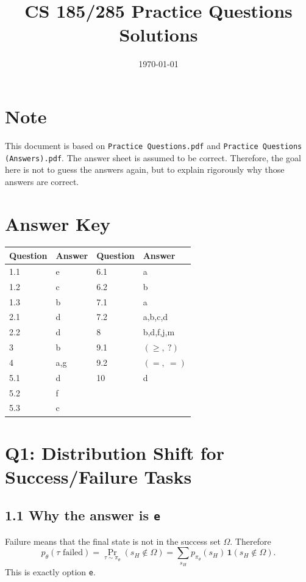 \documentclass[11pt]{article}
\title{CS 185/285 Practice Questions Solutions}
\author{}
\date{\today}
\newcommand{\1}{\mathbf{1}}
\begin{document}
\maketitle

\section*{Note}
This document is based on \texttt{Practice Questions.pdf} and \texttt{Practice Questions (Answers).pdf}. The answer sheet is assumed to be correct. Therefore, the goal here is not to guess the answers again, but to explain rigorously why those answers are correct.

\section*{Answer Key}
\begin{center}
\begin{tabular}{llll}
\toprule
Question & Answer & Question & Answer \\
\midrule
1.1 & e & 6.1 & a \\
1.2 & c & 6.2 & b \\
1.3 & b & 7.1 & a \\
2.1 & d & 7.2 & a,b,c,d \\
2.2 & d & 8 & b,d,f,j,m \\
3 & b & 9.1 & $(\ge,\ ?)$ \\
4 & a,g & 9.2 & $(=,\ =)$ \\
5.1 & d & 10 & d \\
5.2 & f & & \\
5.3 & c & & \\
\bottomrule
\end{tabular}
\end{center}

\section{Q1: Distribution Shift for Success/Failure Tasks}

\subsection*{1.1 Why the answer is \texttt{e}}
Failure means that the final state is not in the success set $\Omega$. Therefore
\[
p_\theta(\tau \text{ failed})
= \Pr_{\tau\sim \pi_\theta}(s_H\notin \Omega)
= \sum_{s_H} p_{\pi_\theta}(s_H)\,\1(s_H\notin \Omega).
\]
This is exactly option \texttt{e}.
\end{document}
